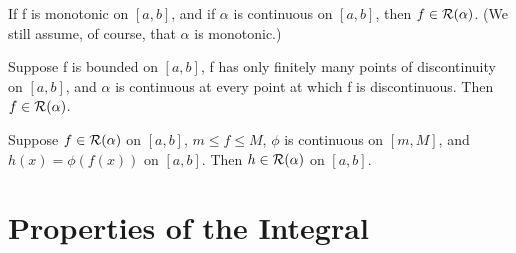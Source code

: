 \begin{theorem} %
  \label{thm:chap6:monotonic_implies_integrable}
  If f is monotonic on $[a, b]$, and if $\alpha$ is continuous on
  $[a, b]$, then $f \in \mathcal{R}(\alpha)$. (We still assume, of
  course, that $\alpha$ is monotonic.)
\end{theorem}

\begin{theorem} %
  \label{thm:chap6:finite_discont_integrable}
  Suppose f is bounded on $[a, b]$, f has only finitely many points
  of discontinuity on $[a, b]$, and $\alpha$ is continuous at every
  point at which f is discontinuous. Then $f \in \mathcal{R}(\alpha)$.
\end{theorem}

\begin{theorem} %
  \label{thm:chap6:continuous_fn_of_integrable}
  Suppose $f \in \mathcal{R}(\alpha)$ on $[a, b]$, $m \le f \le M$,
  $\phi$ is continuous on $[m, M]$, and $h(x) = \phi(f(x))$ on $[a,
  b]$. Then $h \in \mathcal{R}(\alpha)$ on $[a, b]$.
\end{theorem}



\section{Properties of the Integral}
\label{sec:chap6:integral_properties}

